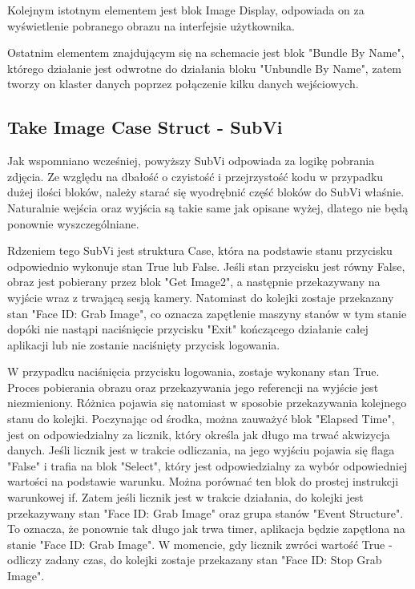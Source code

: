 \documentclass{report}
\begin{document}
Kolejnym istotnym elementem jest blok Image Display, odpowiada on za wyświetlenie pobranego obrazu na interfejsie użytkownika.

Ostatnim elementem znajdującym się na schemacie jest blok "Bundle By Name", którego działanie jest odwrotne do działania bloku "Unbundle By Name", zatem tworzy on klaster danych poprzez połączenie kilku danych wejściowych.

%

\subsection*{Take Image Case Struct - SubVi}

Jak wspomniano wcześniej, powyższy SubVi odpowiada za logikę pobrania zdjęcia. Ze względu na dbałość o czyistość i przejrzystość kodu w przypadku dużej ilości bloków, należy starać się wyodrębnić część bloków do SubVi właśnie. Naturalnie wejścia oraz wyjścia są takie same jak opisane wyżej, dlatego nie będą ponownie wyszczególniane. 

Rdzeniem tego SubVi jest struktura Case, która na podstawie stanu przycisku odpowiednio wykonuje stan True lub False. 
Jeśli stan przycisku jest równy False, obraz jest pobierany przez blok "Get Image2", a następnie przekazywany na wyjście wraz z trwającą sesją kamery. Natomiast do kolejki zostaje przekazany stan "Face ID: Grab Image", co oznacza zapętlenie maszyny stanów w tym stanie dopóki nie nastąpi naciśnięcie przycisku "Exit" kończącego działanie całej aplikacji lub nie zostanie naciśnięty przycisk logowania. 

W przypadku naciśnięcia przycisku logowania, zostaje wykonany stan True. Proces pobierania obrazu oraz przekazywania jego referencji na wyjście jest niezmieniony. Różnica pojawia się natomiast w sposobie przekazywania kolejnego stanu do kolejki. Poczynając od środka, można zauważyć blok "Elapsed Time", jest on odpowiedzialny za licznik, który określa jak długo ma trwać akwizycja danych. Jeśli licznik jest w trakcie odliczania, na jego wyjściu pojawia się flaga "False" i trafia na blok "Select", który jest odpowiedzialny za wybór odpowiedniej wartości na podstawie warunku. Można porównać ten blok do prostej instrukcji warunkowej if. Zatem jeśli licznik jest w trakcie działania, do kolejki jest przekazywany stan "Face ID: Grab Image" oraz grupa stanów "Event Structure". To oznacza, że ponownie tak długo jak trwa timer, aplikacja będzie zapętlona na stanie "Face ID: Grab Image". W momencie, gdy licznik zwróci wartość True - odliczy zadany czas, do kolejki zostaje przekazany stan "Face ID: Stop Grab Image". 
\end{document}
